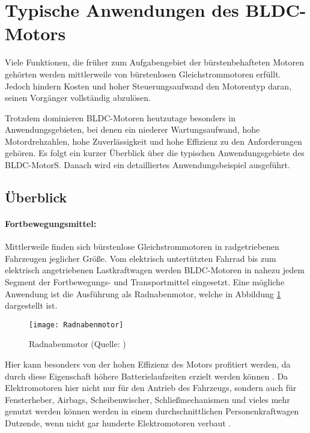 \section{Typische Anwendungen des BLDC-Motors}

Viele Funktionen, die früher zum Aufgabengebiet der bürstenbehafteten Motoren gehörten werden mittlerweile von bürstenlosen Gleichstrommotoren erfüllt. Jedoch hindern Kosten und hoher Steuerungsaufwand den Motorentyp daran, seinen Vorgänger vollständig abzulösen.

Trotzdem dominieren BLDC-Motoren heutzutage besonders in Anwendungsgebieten, bei denen ein niederer Wartungsaufwand, hohe Motordrehzahlen, hohe Zuverlässigkeit und hohe Effizienz zu den Anforderungen gehören. Es folgt ein kurzer Überblick über die typischen Anwendungsgebiete des BLDC-MotorS.  Danach wird ein detailliertes Anwendungsbeispiel ausgeführt.

\subsection{Überblick}

\paragraph{Fortbewegungsmittel:} Mittlerweile finden sich bürstenlose Gleichstrommotoren in radgetriebenen Fahrzeugen jeglicher Größe. Vom elektrisch untertützten Fahrrad \parencite[S. 6]{Xia2012} bis zum elektrisch angetriebenen Lastkraftwagen werden BLDC-Motoren in nahezu jedem Segment der Fortbewegungs- und Transportmittel eingesetzt. Eine mögliche Anwendung ist die Ausführung als Radnabenmotor, welche in Abbildung \ref{fig:Radnabenmotor} dargestellt ist.
\begin{figure}[h]
  \centering
  \texttt{[image: Radnabenmotor]}
  \caption[Radnabenmotor]{Radnabenmotor (Quelle: \parencite[S. 132]{Babiel2014})}
  \label{fig:Radnabenmotor}
\end{figure}
Hier kann besonders von der hohen Effizienz des Motors profitiert werden, da durch diese Eigenschaft höhere Batterielaufzeiten erzielt werden können \parencite[S. 4]{Xia2012}. Da Elektromotoren hier nicht nur für den Antrieb des Fahrzeugs, sondern auch für Fensterheber, Airbags, Scheibenwischer, Schließmechanismen und vieles mehr genutzt werden können werden in einem durchschnittlichen Personenkraftwagen Dutzende, wenn nicht gar hunderte Elektromotoren verbaut \parencite[S. 4]{Xia2012}.

